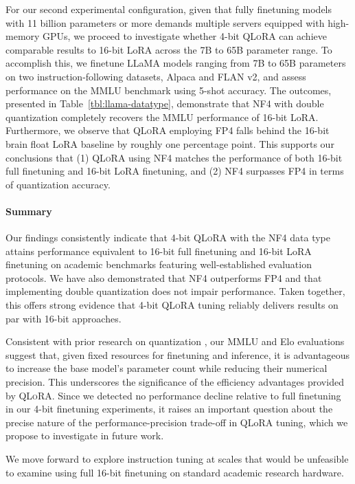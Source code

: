 For our second experimental configuration, given that fully finetuning models with 11 billion parameters or more demands multiple servers equipped with high-memory GPUs, we proceed to investigate whether 4-bit \textsc{QLoRA} can achieve comparable results to 16-bit LoRA across the 7B to 65B parameter range. To accomplish this, we finetune LLaMA models ranging from 7B to 65B parameters on two instruction-following datasets, Alpaca and FLAN v2, and assess performance on the MMLU benchmark using 5-shot accuracy. The outcomes, presented in Table~\ref{tbl:llama-datatype}, demonstrate that NF4 with double quantization completely recovers the MMLU performance of 16-bit LoRA. Furthermore, we observe that \textsc{QLoRA} employing FP4 falls behind the 16-bit brain float LoRA baseline by roughly one percentage point. This supports our conclusions that (1) \textsc{QLoRA} using NF4 matches the performance of both 16-bit full finetuning and 16-bit LoRA finetuning, and (2) NF4 surpasses FP4 in terms of quantization accuracy.

\paragraph{Summary} Our findings consistently indicate that 4-bit \textsc{QLoRA} with the NF4 data type attains performance equivalent to 16-bit full finetuning and 16-bit LoRA finetuning on academic benchmarks featuring well-established evaluation protocols. We have also demonstrated that NF4 outperforms FP4 and that implementing double quantization does not impair performance. Taken together, this offers strong evidence that 4-bit \textsc{QLoRA} tuning reliably delivers results on par with 16-bit approaches.

Consistent with prior research on quantization \citep{dettmers2022case}, our MMLU and Elo evaluations suggest that, given fixed resources for finetuning and inference, it is advantageous to increase the base model's parameter count while reducing their numerical precision. This underscores the significance of the efficiency advantages provided by \textsc{QLoRA}. Since we detected no performance decline relative to full finetuning in our 4-bit finetuning experiments, it raises an important question about the precise nature of the performance-precision trade-off in QLoRA tuning, which we propose to investigate in future work.

We move forward to explore instruction tuning at scales that would be unfeasible to examine using full 16-bit finetuning on standard academic research hardware.

